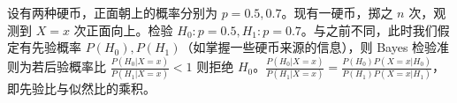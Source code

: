 \documentclass[../main.tex]{subfiles}
\begin{document}
\begin{example}
    设有两种硬币，正面朝上的概率分别为 $p=0.5,0.7$。现有一硬币，掷之 $n$ 次，观测到 $X=x$ 次正面向上。检验 $H_0:p=0.5,H_1:p=0.7$。与之前不同，此时我们假定有先验概率 $P(H_0),P(H_1)$（如掌握一些硬币来源的信息），则 Bayes 检验准则为若后验概率比 $\frac{P(H_0|X=x)}{P(H_1|X=x)}<1$ 则拒绝 $H_0$。$\frac{P(H_0|X=x)}{P(H_1|X=x)}=\frac{P(H_0)P(X=x|H_0)}{P(H_1)P(X=x|H_1)}$，即先验比与似然比的乘积。
\end{example}
\end{document}
